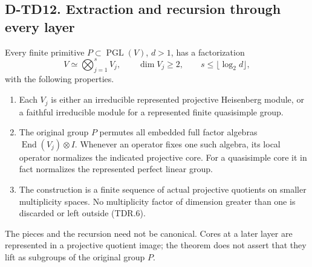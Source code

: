 \subsection*{D-TD12. Extraction and recursion through every layer}

\begin{theorem}[D-TD12]
Every finite primitive $P\subset\operatorname{PGL}(V)$, $d>1$,
has a factorization
\[
 V\simeq\bigotimes_{j=1}^s V_j,\qquad \dim V_j\ge2,
 \qquad s\le\lfloor\log_2 d\rfloor,
 \tag{TDR.6}
\]
with the following properties.
\begin{enumerate}
\item Each $V_j$ is either an irreducible represented projective
Heisenberg module, or a faithful irreducible module for a represented
finite quasisimple group.
\item The original group $P$ permutes all embedded full factor
algebras $\operatorname{End}(V_j)\otimes I$.  Whenever an operator
fixes one such algebra, its local operator normalizes the indicated
projective core.  For a quasisimple core it in fact normalizes the
represented perfect linear group.
\item The construction is a finite sequence of actual projective
quotients on smaller multiplicity spaces.  No multiplicity factor
of dimension greater than one is discarded or left outside (TDR.6).
\end{enumerate}
The pieces and the recursion need not be canonical.  Cores at a
later layer are represented in a projective quotient image; the
theorem does not assert that they lift as subgroups of the original
group $P$.
\end{theorem}

